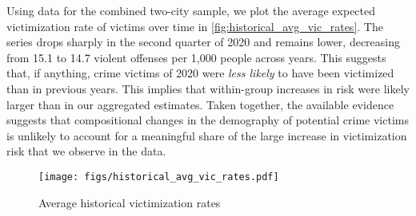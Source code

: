 Using data for the combined two-city sample, we plot the average expected victimization rate of victims over time in \autoref{fig:historical_avg_vic_rates}. The series drops sharply in the second quarter of 2020 and remains lower, decreasing from 15.1 to 14.7 violent offenses per 1,000 people across years. This suggests that, if anything, crime victims of 2020 were \emph{less likely} to have been victimized than in previous years. This implies that within-group increases in risk were likely larger than in our aggregated estimates. Taken together, the available evidence suggests that compositional changes in the demography of potential crime victims is unlikely to account for a meaningful share of the large increase in victimization risk that we observe in the data.

\begin{figure}[h!]
    \caption{Average historical victimization rates}
    \label{fig:historical_avg_vic_rates}
    \begin{center}
    \texttt{[image: figs/historical\_avg\_vic\_rates.pdf]}
    \end{center}
\end{figure}




